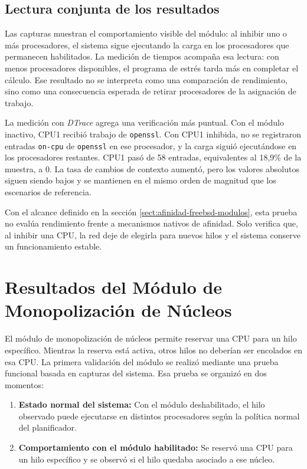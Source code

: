 \subsection{Lectura conjunta de los resultados}

Las capturas muestran el comportamiento visible del módulo: al inhibir uno o más procesadores, el sistema sigue ejecutando la carga en los procesadores que permanecen habilitados. La medición de tiempos acompaña esa lectura: con menos procesadores disponibles, el programa de estrés tarda más en completar el cálculo. Ese resultado no se interpreta como una comparación de rendimiento, sino como una consecuencia esperada de retirar procesadores de la asignación de trabajo.\par

La medición con \textit{DTrace} agrega una verificación más puntual. Con el módulo inactivo, CPU1 recibió trabajo de \verb|openssl|. Con CPU1 inhibida, no se registraron entradas \verb|on-cpu| de \verb|openssl| en ese procesador, y la carga siguió ejecutándose en los procesadores restantes. CPU1 pasó de 58 entradas, equivalentes al 18,9\% de la muestra, a 0. La tasa de cambios de contexto aumentó, pero los valores absolutos siguen siendo bajos y se mantienen en el mismo orden de magnitud que los escenarios de referencia.\par

Con el alcance definido en la sección \ref{sect:afinidad-freebsd-modulos}, esta prueba no evalúa rendimiento frente a mecanismos nativos de afinidad. Solo verifica que, al inhibir una CPU, la red deje de elegirla para nuevos hilos y el sistema conserve un funcionamiento estable.\par

\section{Resultados del Módulo de Monopolización de Núcleos}

El módulo de monopolización de núcleos permite reservar una CPU para un hilo específico. Mientras la reserva está activa, otros hilos no deberían ser encolados en esa CPU. La primera validación del módulo se realizó mediante una prueba funcional basada en capturas del sistema. Esa prueba se organizó en dos momentos:

\begin{enumerate}
    \item \textbf{Estado normal del sistema:} Con el módulo deshabilitado, el hilo observado puede ejecutarse en distintos procesadores según la política normal del planificador.
    \item \textbf{Comportamiento con el módulo habilitado:} Se reservó una CPU para un hilo específico y se observó si el hilo quedaba asociado a ese núcleo.
\end{enumerate}

